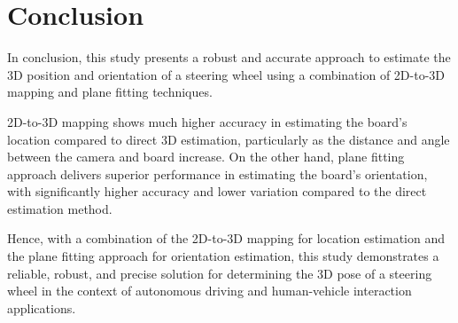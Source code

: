 \section{Conclusion}
In conclusion, this study presents a robust and accurate approach to estimate the 3D position and orientation of a steering wheel using a combination of 2D-to-3D mapping and plane fitting techniques. 

2D-to-3D mapping shows much higher accuracy in estimating the board’s location compared to direct 3D estimation, particularly as the distance and angle between the camera and board increase. On the other hand, plane fitting approach delivers superior performance in estimating the board's orientation, with significantly higher accuracy and lower variation compared to the direct estimation method.

Hence, with a combination of the 2D-to-3D mapping for location estimation and the plane fitting approach for orientation estimation, this study demonstrates a reliable, robust, and precise solution for determining the 3D pose of a steering wheel in the context of autonomous driving and human-vehicle interaction applications. 